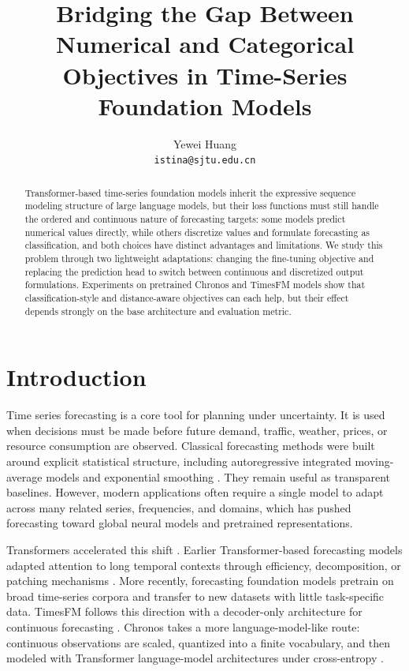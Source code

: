 \documentclass{article}
\title{Bridging the Gap Between Numerical and Categorical Objectives in Time-Series Foundation Models}
\author{
  Yewei Huang \\
  \texttt{istina@sjtu.edu.cn}
}
\begin{document}
\maketitle


\begin{abstract}
Transformer-based time-series foundation models inherit the expressive sequence
modeling structure of large language models, but their loss functions must still
handle the ordered and continuous nature of forecasting targets: some models
predict numerical values directly, while others discretize values and formulate
forecasting as classification, and both choices have distinct advantages and
limitations.  We study this problem through two lightweight adaptations:
changing the fine-tuning objective and replacing the prediction head to switch
between continuous and discretized output formulations.  Experiments on
pretrained Chronos and TimesFM models show that classification-style and
distance-aware objectives can each help, but their effect depends strongly on the
base architecture and evaluation metric.
\end{abstract}


\section{Introduction}

Time series forecasting is a core tool for planning under uncertainty.  It is
used when decisions must be made before future demand, traffic, weather, prices,
or resource consumption are observed.  Classical forecasting methods were built
around explicit statistical structure, including autoregressive integrated
moving-average models and exponential smoothing
\citep{box1970time,winters1960forecasting}.  They remain useful as transparent
baselines.  However, modern applications often require a single model to adapt
across many related series, frequencies, and domains, which has pushed
forecasting toward global neural models and pretrained representations.

Transformers accelerated this shift \citep{vaswani2017attention}.  Earlier
Transformer-based forecasting models adapted attention to long temporal contexts
through efficiency, decomposition, or patching mechanisms
\citep{zhou2021informer,wu2021autoformer,nie2023patchtst}.  More recently,
forecasting foundation models pretrain on broad time-series corpora and transfer
to new datasets with little task-specific data.  TimesFM follows this direction
with a decoder-only architecture for continuous forecasting
\citep{das2024timesfm}.  Chronos takes a more language-model-like route:
continuous observations are scaled, quantized into a finite vocabulary, and then
modeled with Transformer language-model architectures under cross-entropy
\citep{ansari2024chronos}.
\end{document}
